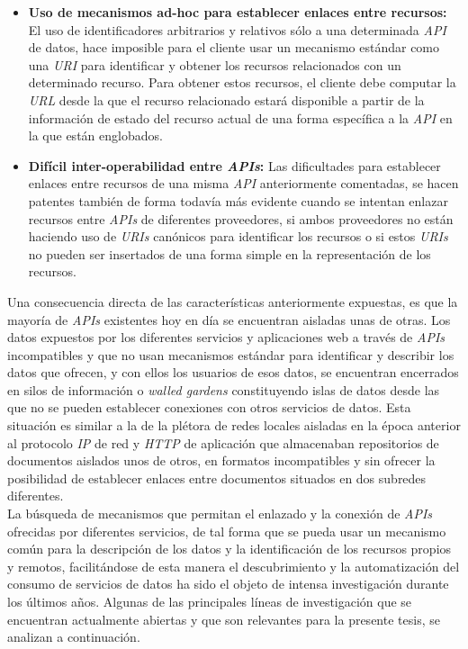 \begin{itemize}
\item \textbf{Uso de mecanismos ad-hoc para establecer enlaces entre recursos:} El uso de identificadores arbitrarios y relativos s\'olo a una determinada \textit{API} de datos, hace imposible para el cliente usar un mecanismo est\'andar como una \textit{URI} para identificar y obtener los recursos relacionados con un determinado recurso. Para obtener estos recursos, el cliente debe computar la \textit{URL} desde la que el recurso relacionado estar\'a disponible a partir de la informaci\'on de estado del recurso actual de una forma espec\'ifica a la \textit{API} en la que est\'an englobados.

\item \textbf{Dif\'icil inter-operabilidad entre \textit{APIs}:} Las dificultades para establecer enlaces entre recursos de una misma \textit{API} anteriormente comentadas, se hacen patentes tambi\'en de forma todav\'ia m\'as evidente cuando se intentan enlazar recursos entre \textit{APIs} de diferentes proveedores, si ambos proveedores no est\'an haciendo uso de \textit{URIs} can\'onicos para identificar los recursos o si estos \textit{URIs} no pueden ser insertados de una forma simple en la representaci\'on de los recursos.

\end{itemize}

Una consecuencia directa de las caracter\'isticas anteriormente expuestas, es que la mayor\'ia de \textit{APIs} existentes hoy en d\'ia se encuentran aisladas unas de otras. Los datos expuestos por los diferentes servicios y aplicaciones web a trav\'es de \textit{APIs} incompatibles y que no usan mecanismos est\'andar para identificar y describir los datos que ofrecen, y con ellos los usuarios de esos datos, se encuentran encerrados en silos de informaci\'on o \textit{walled gardens} \cite{halpin2008beyond} constituyendo islas de datos desde las que no se pueden establecer conexiones con otros servicios de datos. Esta situaci\'on es similar a la de la pl\'etora de redes locales aisladas en la \'epoca anterior al protocolo \textit{IP} de red y \textit{HTTP} de aplicaci\'on que almacenaban repositorios de documentos aislados unos de otros, en formatos incompatibles y sin ofrecer la posibilidad de establecer enlaces entre documentos situados en dos subredes diferentes.\\

La b\'usqueda de mecanismos que permitan el enlazado y la conexi\'on de \textit{APIs} ofrecidas por diferentes servicios, de tal forma que se pueda usar un mecanismo com\'un para la descripci\'on de los datos y la identificaci\'on de los recursos propios y remotos, facilit\'andose de esta manera el descubrimiento y la automatizaci\'on del consumo de servicios de datos ha sido el objeto de intensa investigaci\'on durante los \'ultimos a\~nos.
Algunas de las principales l\'ineas de investigaci\'on que se encuentran actualmente abiertas y que son relevantes para la presente tesis, se analizan a continuaci\'on.

